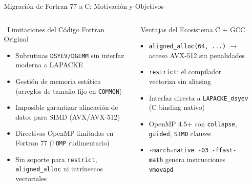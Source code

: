 \documentclass[aspectratio=169,10pt]{beamer}
\begin{document}
\begin{frame}[allowframebreaks]{Migración de Fortran 77 a C: Motivación y Objetivos}
\begin{columns}[T]
\begin{alertbox}{\faBug\ Limitaciones del Código Fortran Original}
\begin{itemize}\setlength\itemsep{3pt}
  \item Subrutinas \texttt{DSYEV/DGEMM} sin interfaz moderna a LAPACKE
  \item Gestión de memoria estática (arreglos de tamaño fijo en \texttt{COMMON})
  \item Imposible garantizar alineación de datos para SIMD (AVX/AVX-512)
  \item Directivas OpenMP limitadas en Fortran 77 (\texttt{!OMP} rudimentario)
  \item Sin soporte para \texttt{restrict}, \texttt{aligned\_alloc} ni intrínsecos vectoriales
\end{itemize}
\end{alertbox}

\begin{successbox}{\faRocket\ Ventajas del Ecosistema C + GCC}
\begin{itemize}\setlength\itemsep{3pt}
  \item \texttt{aligned\_alloc(64, ...)} $\rightarrow$ acceso AVX-512 sin penalidades
  \item \texttt{restrict}: el compilador vectoriza sin aliasing
  \item Interfaz directa a \texttt{LAPACKE\_dsyev} (C binding nativo)
  \item OpenMP 4.5+ con \texttt{collapse}, \texttt{guided}, \texttt{SIMD} clauses
  \item \texttt{-march=native -O3 -ffast-math} genera instrucciones \texttt{vmovapd}
\end{itemize}
\end{successbox}
\end{columns}

\vspace{0.27cm}
\begin{center}
\end{center}
\end{frame}
\end{document}
